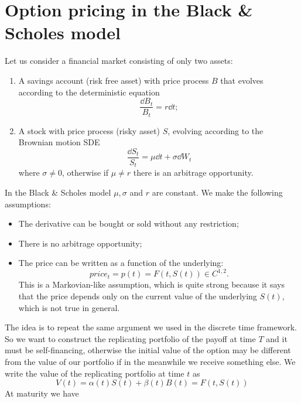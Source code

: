 \section{Option pricing in the Black \& Scholes model} %
Let us consider a financial market consisting of only two assets: 
\begin{enumerate}
    \item A savings account (risk free asset) with price process $B$
    that evolves according to the deterministic equation
    \begin{equation}
        \dfrac{\dd B_t}{B_t} = r \dd t;
    \end{equation}
    \item A stock with price process (risky asset) $S$, evolving according to the Brownian motion SDE
    \begin{equation}\label{bmsde}
        \dfrac{\dd S_t}{S_t} = \mu \dd t + \sigma \dd W_t
    \end{equation}
    where $\sigma\ne0$, otherwise if $\mu\ne r$ there is an arbitrage opportunity.
\end{enumerate}
In the Black \& Scholes model $\mu,\sigma$ and $r$ are constant. We make the following assumptions:
\begin{itemize}
    \item The derivative can be bought or sold without any restriction;
    \item There is no arbitrage opportunity;
    \item The price can be written as a function of the underlying:
    \begin{equation}
        price_t = p(t) = F(t,S(t))\in C^{1,2}.
    \end{equation}
    This is a Markovian-like assumption, which is quite strong because it says that the price depends only on the current value of the underlying $S(t)$, which is not true in general. 
\end{itemize}
The idea is to repeat the same argument we used in the discrete time framework. So we want to construct the replicating portfolio of the payoff at time $T$ and it must be self-financing, otherwise the initial value of the option may be different from the value of our portfolio if in the meanwhile we receive something else. We write the value of the replicating portfolio at time $t$ as 
\begin{equation}\label{v}
    V(t) = \alpha(t)S(t) + \beta(t)B(t) = F(t,S(t))
\end{equation}
At maturity we have
